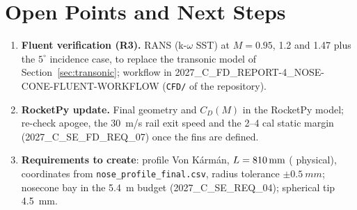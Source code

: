\section{Open Points and Next Steps}
\label{sec:next}

\begin{enumerate}[leftmargin=*,itemsep=3pt]
\item \textbf{Fluent verification (R3).} RANS (k-$\omega$ SST) at $M = 0.95$, 1.2 and 1.47 plus the
$5^\circ$ incidence case, to replace the transonic model of Section~\ref{sec:transonic}; workflow in
2027\_C\_FD\_REPORT-4\_NOSE-CONE-FLUENT-WORKFLOW (\texttt{CFD/} of the repository).
\item \textbf{RocketPy update.} Final geometry and $C_D(M)$ in the RocketPy model; re-check apogee, the
\SI{30}{m/s} rail exit speed and the 2--4 cal static margin (2027\_C\_SE\_\allowbreak FD\_REQ\_07) once
the fins are defined.
\item \textbf{Requirements to create}: profile Von K\'arm\'an, $L = \SI{810}{mm}{}$ (\FINLPHYS{} physical),
coordinates from \texttt{nose\_profile\_final.csv}, radius tolerance $\pm\SI{0.5}{mm}$; nosecone bay
\FINBAY{} in the \SI{5.4}{m} budget (2027\_C\_SE\_REQ\_04); spherical tip \SI{4.5}{mm}.
\end{enumerate}
